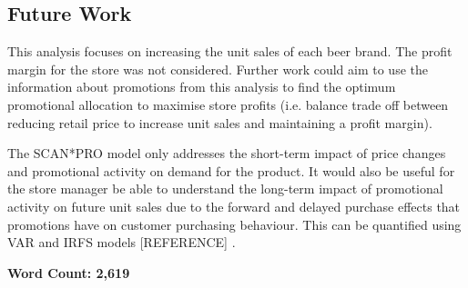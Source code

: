 \documentclass[a4paper,11pt]{article}
\begin{document}
\subsection{Future Work}
This analysis focuses on increasing the unit sales of each beer brand. The profit margin for the store was not considered. Further work could aim to use the information about promotions from this analysis to find the optimum promotional allocation to maximise store profits (i.e. balance trade off between reducing retail price to increase unit sales and maintaining a profit margin).

The SCAN*PRO model only addresses the short-term impact of price changes and promotional activity on demand for the product. It would also be useful for the store manager be able to understand the long-term impact of promotional activity on future unit sales due to the forward and delayed purchase effects that promotions have on customer purchasing behaviour. This can be quantified using VAR and IRFS models [REFERENCE] .  


\textbf{Word Count: 2,619}



\end{document}
